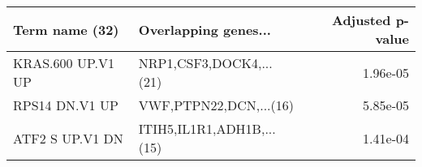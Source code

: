 \begin{tabular}{llr}
\toprule
   Term name (32) &      Overlapping genes... &  Adjusted p-value \\
\midrule
KRAS.600 UP.V1 UP &   NRP1,CSF3,DOCK4,...(21) &          1.96e-05 \\
   RPS14 DN.V1 UP &    VWF,PTPN22,DCN,...(16) &          5.85e-05 \\
  ATF2 S UP.V1 DN & ITIH5,IL1R1,ADH1B,...(15) &          1.41e-04 \\
\bottomrule
\end{tabular}
